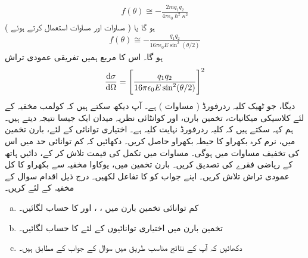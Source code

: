 \begin{align}
	f(\theta)\cong-\frac{2mq_1q_2}{4\pi\epsilon_0\hslash^2\kappa^2}
\end{align}
ہو گا یا ( مساوات  اور مساوات  استعمال کرتے ہوئے ) 
\begin{align}
	f(\theta)\cong-\frac{q_1q_2}{16\pi\epsilon_0E\sin^2(\theta/2)}
\end{align}
ہو گا۔ اس کا مربع ہمیں تفریقی عمودی تراش 
\begin{align}
	\frac{\dif\sigma}{\dif\Omega}=\left[\frac{q_1q_2}{16\pi\epsilon_0E\sin^2(\theta/2)}\right]^2
\end{align}
دیگا، جو ٹھیک کلیہ ردرفورڈ ( مساوات ) ہے۔ آپ دیکھ سکتے ہیں کہ کولمب مخفیہ کے لئے کلاسیکی میکانیات، تخمین بارن، اور کوانٹائی نظریہ میدان ایک جیسا نتیجہ دیتے ہیں۔ ہم کہہ سکتے ہیں کہ کلیہ ردرفورڈ نہایت  کلیہ ہے۔
اختیاری توانائی کے لئے، بارن تخمین میں، نرم کرہ بکھراو کا حیطہ بکھراو حاصل کریں۔ دکھائیں کہ کم توانائی حد میں اس کی تخفیف مساوات  میں ہوگی۔
مساوات  میں تکمل کی قیمت تلاش کر کے، دائیں ہاتھ کے ریاضی فقرے کی تصدیق کریں۔
بارن تخمین میں، یوکاوا مخفیہ سے بکھراو کا کل عمودی تراش تلاش کریں۔ اپنے جواب کو  کا تفاعل لکھیں۔
درج ذیل اقدام سوال  کے مخفیہ کے لئے کریں۔
\begin{enumerate}[a.]
\item
 کم توانائی تخمین بارن میں ، ، اور  کا حساب لگائیں۔
\item
 تخمین بارن میں اختیاری توانائیوں کے لئے  کا حساب لگائیں۔
\item
دکھائیں کہ آپ کے نتائج مناسب طریق میں سوال  کے جواب کے مطابق ہیں۔
\end{enumerate}


